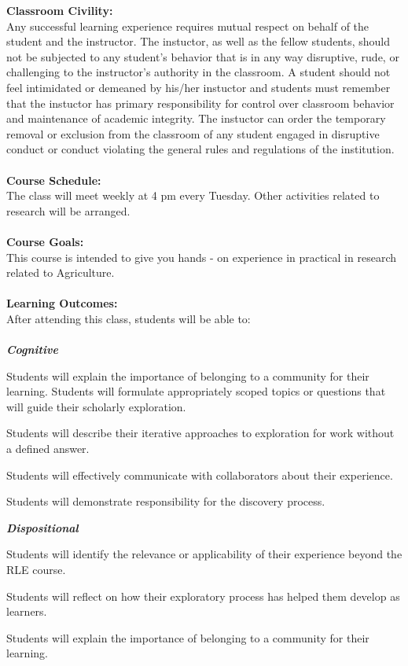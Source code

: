 \documentclass[11pt]{article}
\begin{document}
\noindent\textbf{Classroom Civility:}\\ Any successful learning experience requires mutual respect on behalf of the student and the instructor. The instuctor, as well as the fellow students, should not be subjected to any student's behavior that is in any way disruptive, rude, or challenging to the instructor's authority in the classroom. A student should not feel intimidated or demeaned by his/her instuctor and students must remember that the instuctor has primary responsibility for control over classroom behavior and maintenance of academic integrity. The instuctor can order the temporary removal or exclusion from the classroom of any student engaged in disruptive conduct or conduct violating the general rules and regulations of the institution.\\~\\
\textbf{Course Schedule:}\\
The class will meet weekly at 4 pm every Tuesday. Other activities related to research will be arranged.\\~\\
\noindent\textbf{Course Goals:}\\
This course is intended to give you hands - on experience in practical in research related to Agriculture.\\~\\
\noindent\textbf{Learning Outcomes:}\\After attending this class, students will be able to:\\~\\
\textbf{\emph{Cognitive}}
\begin{description}[topsep=11pt, noitemsep]
\item[\textbf{1.}] Students will explain the importance of belonging to a community for their learning. Students will formulate appropriately scoped topics or questions that will guide their scholarly exploration. 
\item[\textbf{2.}] Students will describe their iterative approaches to exploration for work without a defined answer.
\item[\textbf{3.}] Students will effectively communicate with collaborators about their experience. 
\item[\textbf{4.}] Students will demonstrate responsibility for the discovery process. 
\end{description} 
\newpage \noindent
\textbf{\emph{Dispositional}}
\begin{description}[topsep=11pt, noitemsep]
\item[\textbf{1.}] Students will identify the relevance or applicability of their experience beyond the RLE course. 
\item[\textbf{2.}] Students will reflect on how their exploratory process has helped them develop as learners. 
\item[\textbf{3.}] Students will explain the importance of belonging to a community for their learning.
\end{description}
\end{document}
